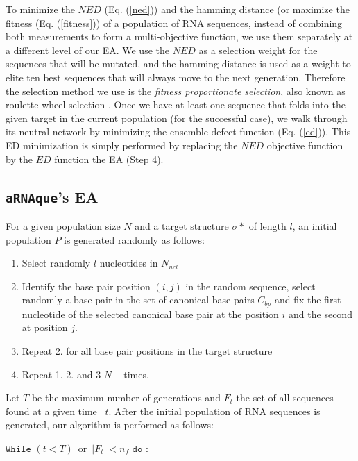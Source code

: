 To minimize the $NED$ (Eq. (\ref{ned})) and the hamming distance (or maximize the fitness (Eq. (\ref{fitness})) of a population of RNA sequences, instead of combining both measurements to form a multi-objective function, we use them separately at a different level of our EA. We use the $NED$ as a selection weight for the sequences that will be mutated, and the hamming distance is used as a weight to elite ten best sequences that will always move to the next generation. Therefore the selection method we use is the \textit{fitness proportionate selection}, also known as roulette wheel selection \cite{lipowski2012roulette}. Once we have at least one sequence that folds into the given target in the current population (for the successful case), we walk through its neutral network by minimizing the ensemble defect function (Eq. (\ref{ed})). This ED minimization is simply performed by replacing the $NED$ objective function by the $ED$ function the EA (Step 4).

\subsection{\texttt{aRNAque}'s EA}

For a given population size $N$ and a target structure $\sigma*$ of length $l$, an initial population $P$ is generated randomly as follows: 

\begin{enumerate}
	\item Select randomly $l$ nucleotides in $N_{ucl.}$
	
	\item Identify the base pair position $(i,j)$ in the random sequence, select randomly a base pair in the set of canonical base pairs $C_{bp}$ and fix the first nucleotide of the selected canonical base pair at the position $i$ and the second at position $j$.
	
	\item  Repeat 2. for all base pair positions in the target structure
	
	\item Repeat 1. 2. and 3 $N-$times.
\end{enumerate}
Let \(T\) be the maximum number of generations and \(F_t\) the set of all sequences found at a given time ~\(t\). After the initial population of RNA sequences is generated, our algorithm is performed as follows:
\vspace{0.05cm}

\(\texttt{While}\) \((t<T)\)~or~\( |F_t| <n_f\)
\(\texttt{do}\) :

